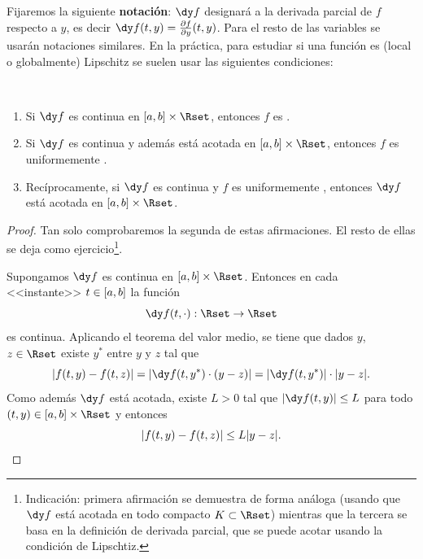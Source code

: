 Fijaremos la siguiente
\textbf{notación}: $\dy f$ designará a la derivada parcial de $f$
respecto a $y$, es decir $\dy f(\tt,y) = \frac{\partial f}{\partial
  \yy}(\tt,y)$. Para el resto de las variables se usarán notaciones
similares.
  En la práctica, para estudiar si una función es (local o
  globalmente) Lipschitz se suelen usar las siguientes condiciones:
  \begin{proposition}~
    \begin{enumerate}
    \item Si $\dy f$ es continua en $[\ta,\tb]\times\Rset$, entonces
      $f$ es \locLipschitz.
    \item Si $\dy f$ es continua y además está acotada en
      $[\ta,\tb]\times\Rset$, entonces $f$ es uniformemente
      \globLipschitz.
    \item Recíprocamente, si $\dy f$ es continua y $f$ es
      uniformemente \globLipschitz, entonces $\dy f$ está acotada en
      $[\ta,\tb]\times\Rset$.
    \end{enumerate}
  \end{proposition}
  \begin{proof}
    Tan solo comprobaremos la segunda de estas afirmaciones. El resto
    de ellas se deja como ejercicio\footnote{Indicación: primera
      afirmación se demuestra de forma análoga (usando que $\dy f$
      está acotada en todo compacto $K\subset\Rset$) mientras que la
      tercera se basa en la definición de derivada parcial, que se
      puede acotar usando la condición de Lipschtiz.}.

    Supongamos $\dy f$ es
    continua en $[\ta,\tb]\times\Rset$. Entonces en cada <<instante>>
    $t\in[\ta,\tb]$ la función
  $$\dy f(t,\cdot):\Rset \to \Rset$$
  es continua. Aplicando el teorema del valor medio, se tiene que
  dados $y$, $z\in\Rset$ existe $y^*$ entre $y$ y $z$ tal que
  \begin{equation*}
    |f(\tt,y)-f(\tt,z)| = |\dy f(\tt,y^*) \cdot (y-z)|=|\dy f(\tt,y^*)| \cdot |y-z|.
  \end{equation*}
  Como además $\dy f$ está acotada, existe $L>0$ tal que
  $|\dy f(\tt,y)|\le L$ para todo $(\tt,y)\in [\ta,\tb]\times\Rset$ y
  entonces
  \begin{equation*}
    |f(\tt,y) - f(\tt,z)| \le L |y-z|.
  \end{equation*}
\end{proof}

